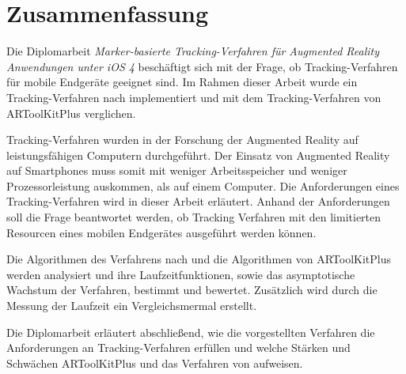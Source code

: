 \chapter*{Zusammenfassung} %
\label{cha:abstract-deu}
Die Diplomarbeit \emph{Marker-basierte Tracking-Verfahren für Augmented Reality Anwendungen unter iOS 4} beschäftigt
 sich mit der Frage, ob Tracking-Verfahren für mobile Endgeräte geeignet sind. Im Rahmen dieser Arbeit wurde ein
 Tracking-Verfahren nach \citeauthor{hirzer08} implementiert und mit dem Tracking-Verfahren von ARToolKitPlus
 verglichen.

Tracking-Verfahren wurden in der Forschung der Augmented Reality auf leistungsfähigen Computern durchgeführt. Der
 Einsatz von Augmented Reality auf Smartphones muss somit mit weniger Arbeitsspeicher und weniger Prozessorleistung
 auskommen, als auf einem Computer. Die Anforderungen eines Tracking-Verfahren wird in dieser Arbeit erläutert. Anhand
 der Anforderungen soll die Frage beantwortet werden, ob Tracking Verfahren mit den limitierten Resourcen eines
 mobilen Endgerätes ausgeführt werden können.

Die Algorithmen des Verfahrens nach \citeauthor{hirzer08} und die Algorithmen von ARToolKitPlus werden analysiert und
 ihre Laufzeitfunktionen, sowie das asymptotische Wachstum der Verfahren, bestimmt und bewertet. Zusätzlich wird durch
 die Messung der Laufzeit ein Vergleichsmermal erstellt.

Die Diplomarbeit erläutert abschließend, wie die vorgestellten Verfahren die Anforderungen an Tracking-Verfahren
 erfüllen und welche Stärken und Schwächen ARToolKitPlus und das Verfahren von \citeauthor{hirzer08} aufweisen.

\mainmatter



%
\appendix

\backmatter

\printbibliography[]



